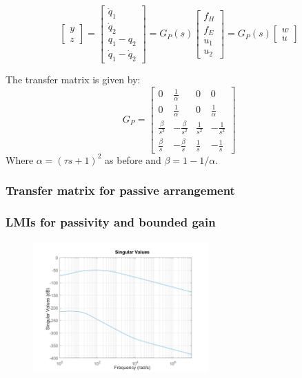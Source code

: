 \documentclass{article}
\begin{document}
\begin{equation}
    \begin{bmatrix}
        y \\
        z
    \end{bmatrix} = \begin{bmatrix}
        \dot{q}_1 \\
        \dot{q}_2 \\
        q_1 - q_2 \\
        \dot{q}_1 - \dot{q}_2
    \end{bmatrix} = G_P(s) \begin{bmatrix}
        f_H \\
        f_E \\
        u_1 \\
        u_2
    \end{bmatrix} = G_P(s) \begin{bmatrix}
        w \\
        u
    \end{bmatrix}
\end{equation}

The transfer matrix is given by:
\begin{equation}
    G_P = 
    \begin{bmatrix}
        0 & \frac{1}{\alpha} & 0 & 0 \\[6pt]
        0 & \frac{1}{\alpha} & 0 & \frac{1}{\alpha} \\[6pt]
        \frac{\beta}{s^2} & -\frac{\beta}{s^2} & \frac{1}{s^2} & -\frac{1}{s^2} \\[6pt]
        \frac{\beta}{s} & -\frac{\beta}{s} & \frac{1}{s} & -\frac{1}{s}
    \end{bmatrix}
\end{equation}
Where $\alpha = (\tau s + 1)^2$ as before and $\beta = 1 - 1/\alpha$.

\subsubsection{Transfer matrix for passive arrangement}

\subsubsection{LMIs for passivity and bounded gain}

\begin{figure}[H]
    \centering
    \includegraphics[width=0.6\textwidth]{figures/K_p_sigma.png}
    \caption{}
\end{figure}
\end{document}
